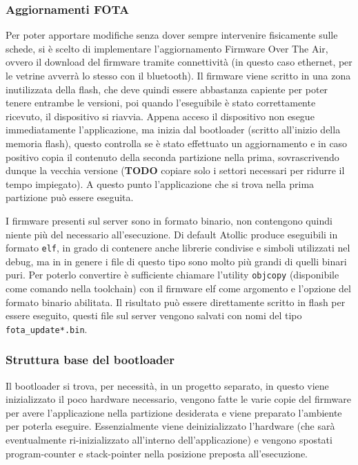 \subsubsection{Aggiornamenti FOTA}

Per poter apportare modifiche senza dover sempre intervenire fisicamente sulle schede, si \`e scelto di implementare l'aggiornamento Firmware Over The Air, ovvero il download del firmware tramite connettivit\`a (in questo caso ethernet, per le vetrine avverr\`a lo stesso con il bluetooth). Il firmware viene scritto in una zona inutilizzata della flash, che deve quindi essere abbastanza capiente per poter tenere entrambe le versioni, poi quando l'eseguibile \`e stato correttamente ricevuto, il dispositivo si riavvia. Appena acceso il dispositivo non esegue immediatamente l'applicazione, ma inizia dal bootloader (scritto all'inizio della memoria flash), questo controlla se \`e stato effettuato un aggiornamento e in caso positivo copia il contenuto della seconda partizione nella prima, sovrascrivendo dunque la vecchia versione (\textbf{TODO} copiare solo i settori necessari per ridurre il tempo impiegato). A questo punto l'applicazione che si trova nella prima partizione pu\`o essere eseguita.

I firmware presenti sul server sono in formato binario, non contengono quindi niente pi\`u del necessario all'esecuzione. Di default Atollic produce eseguibili in formato \texttt{elf}, in grado di contenere anche librerie condivise e simboli utilizzati nel debug, ma in in genere i file di questo tipo sono molto pi\`u grandi di quelli binari puri. Per poterlo convertire \`e sufficiente chiamare l'utility \texttt{objcopy} (disponibile come comando nella toolchain) con il firmware elf come argomento e l'opzione del formato binario abilitata. Il risultato pu\`o essere direttamente scritto in flash per essere eseguito, questi file sul server vengono salvati con nomi del tipo \texttt{fota\_update*.bin}.

\subsubsection{Struttura base del bootloader}

Il bootloader si trova, per necessit\`a, in un progetto separato, in questo viene inizializzato il poco hardware necessario, vengono fatte le varie copie del firmware per avere l'applicazione nella partizione desiderata e viene preparato l'ambiente per poterla eseguire. Essenzialmente viene deinizializzato l'hardware (che sar\`a eventualmente ri-inizializzato all'interno dell'applicazione) e vengono spostati program-counter e stack-pointer nella posizione preposta all'esecuzione.


